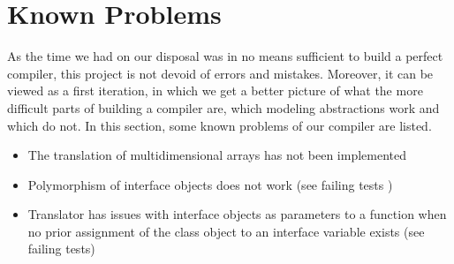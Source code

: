 \section{Known Problems}
\label{sec:problems}
As the time we had on our disposal was in no means sufficient 
to build a perfect compiler, this project is not devoid of errors and mistakes.
Moreover, it can be viewed as a first iteration, in which
we get a better picture of what the more difficult parts of building
a compiler are, which modeling abstractions work and which do not.
In this section, some known problems of our compiler are listed.

\begin{itemize}
    \item The translation of multidimensional arrays has not been implemented
    \item Polymorphism of interface objects does not work (see failing tests \cite{repository})
    \item Translator has issues with interface objects as parameters to a function
        when no prior assignment of the class object to an interface variable exists (see failing tests\cite{repository})
\end{itemize}
